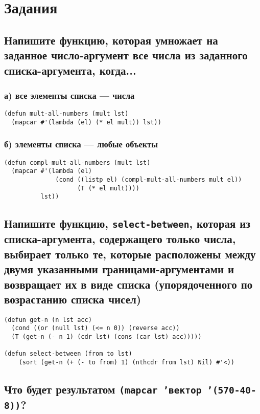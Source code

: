 \chapter{Задания}

\section{Напишите функцию, которая умножает на заданное число-аргумент все числа из заданного списка-аргумента, когда...}

\subsection{а) все элементы списка --- числа}

\begin{lstlisting}
(defun mult-all-numbers (mult lst)
  (mapcar #'(lambda (el) (* el mult)) lst))
\end{lstlisting}

\subsection{б) элементы списка --- любые объекты}

\begin{lstlisting}
(defun compl-mult-all-numbers (mult lst)
  (mapcar #'(lambda (el) 
              (cond ((listp el) (compl-mult-all-numbers mult el))
                    (T (* el mult))))
          lst))
\end{lstlisting}

\section{Напишите функцию, \texttt{select-between}, которая из списка-аргумента, содержащего только числа, выбирает только те, которые расположены между двумя указанными границами-аргументами и возвращает их в виде списка (упорядоченного по возрастанию списка чисел)}

\begin{lstlisting}
(defun get-n (n lst acc)
  (cond ((or (null lst) (<= n 0)) (reverse acc))
  (T (get-n (- n 1) (cdr lst) (cons (car lst) acc)))))

(defun select-between (from to lst) 
    (sort (get-n (+ (- to from) 1) (nthcdr from lst) Nil) #'<))
\end{lstlisting}

\section{Что будет результатом \texttt{(mapcar 'вектор '(570-40-8))}?}

